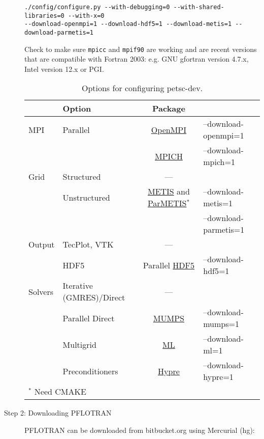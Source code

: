 \begin{description}
\begin{Verbatim}
./config/configure.py --with-debugging=0 --with-shared-libraries=0 --with-x=0 
--download-openmpi=1 --download-hdf5=1 --download-metis=1 --download-parmetis=1
\end{Verbatim}
\normalsize

\noindent
Check to make sure {\footnotesize\tt mpicc} and {\footnotesize\tt mpif90} are working and are recent versions that are compatible with Fortran 2003: e.g. GNU gfortran version 4.7.x, Intel version 12.x or PGI.

\begin{table}[H]\centering
\caption{Options for configuring petsc-dev.}
\label{tinstall}

\vspace{3mm}

\begin{tabular}{llcl}
\toprule
& Option & Package\\
\midrule
MPI & Parallel & \href{http://www.open-mpi.org/}{OpenMPI} & --download-openmpi=1\\
&& \href{http://www.mpich.org/}{MPICH} &--download-mpich=1\\
\midrule
Grid & Structured & ---\\
& Unstructured & \href{http://glaros.dtc.umn.edu/gkhome/views/metis}{METIS} and \href{http://glaros.dtc.umn.edu/gkhome/views/metis}{ParMETIS}$^*$ & --download-metis=1\\
&&& --download-parmetis=1\\
\midrule
Output & TecPlot, VTK & ---\\
& HDF5 & Parallel \href{http://www.hdfgroup.org/HDF5/}{HDF5} & --download-hdf5=1\\
\midrule
Solvers & Iterative (GMRES)/Direct & ---\\
& Parallel Direct & \href{http://graal.ens-lyon.fr/MUMPS/}{MUMPS} & --download-mumps=1\\
& Multigrid & \href{http://trilinos.sandia.gov/packages/ml/}{ML} & --download-ml=1\\
& Preconditioners & \href{http://acts.nersc.gov/hypre/}{Hypre} & --download-hypre=1\\
\bottomrule
\multicolumn{2}{l}{$^*$ Need CMAKE}
\end{tabular}
\end{table}

\item[Step 2: Downloading PFLOTRAN] PFLOTRAN can be downloaded from bitbucket.org using Mercurial (hg):


\end{description}
